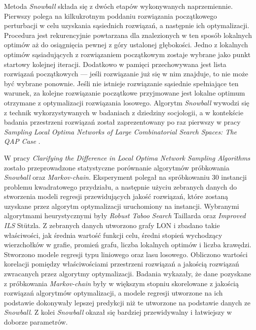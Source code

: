 Metoda \textit{Snowball} składa się z dwóch etapów wykonywanych naprzemiennie. Pierwszy polega na kilkukrotnym poddaniu rozwiązania początkowego perturbacji
w celu uzyskania sąsiednich rozwiązań, a następnie ich optymalizacji. Procedura jest rekurencyjnie powtarzana dla znalezionych w ten sposób lokalnych optimów
aż do osiągnięcia pewnej z góry ustalonej głębokości. Jedno z lokalnych optimów sąsiadujących z rozwiązaniem początkowym zostaje wybrane jako punkt startowy kolejnej iteracji.
Dodatkowo w pamięci przechowywana jest lista rozwiązań początkowych --- jeśli rozwiązanie już się w nim znajduje, to nie może być wybrane ponownie.
Jeśli nie istnieje rozwiązanie sąsiednie spełniające ten warunek, za kolejne rozwiązanie początkowe przyjmowane jest lokalne optimum otrzymane z optymalizacji rozwiązania losowego.
Algorytm \textit{Snowball} wywodzi się z technik wykorzystywanych w badaniach z dziedziny socjologii, a w kontekście badania przestrzeni rozwiązań
został zaprezentowany po raz pierwszy w pracy \textit{Sampling Local Optima Networks of Large Combinatorial Search Spaces: The QAP Case}
\cite{DBLP:conf/ppsn/VerelDOT18}.

W pracy \textit{Clarifying the Difference in Local Optima Network Sampling Algorithms} \cite{DBLP:conf/evoW/ThomsonOV19}
zostało przeprowadzone statystyczne porównanie algorytmów próbkowania \textit{Snowball}
oraz \textit{Markov-chain}. Eksperyment polegał na spróbkowaniu 30 instancji problemu kwadratowego przydziału, a następnie użyciu zebranych danych
do stworzenia modeli regresji przewidujących jakość rozwiązań, które zostaną uzyskane przez algorytm optymalizacji uruchomiony na instancji.
Wybranymi algorytmami heurystycznymi były \textit{Robust Taboo Search} Taillarda oraz \textit{Improved ILS} Stützla.
Z zebranych danych utworzono grafy LON i zbadano takie właściwości, jak średnia wartość funkcji celu, średni stopień wychodzący
wierzchołków w grafie, promień grafu, liczba lokalnych optimów i liczba krawędzi.
Stworzono modele regresji typu liniowego oraz lasu losowego. Obliczono wartości korelacji pomiędzy właściwościami przestrzeni rozwiązań
a jakością rozwiązań zwracanych przez algorytmy optymalizacji.
Badania wykazały, że dane pozyskane z próbkowania \textit{Markov-chain} były w większym stopniu skorelowane z jakością rozwiązań algorytmów
optymalizacji, a modele regresji utworzone na ich podstawie dokonywały lepszej predykcji niż te utworzone na podstawie danych ze \textit{Snowball}.
Z kolei \textit{Snowball} okazał się bardziej przewidywalny i łatwiejszy w doborze parametrów.

